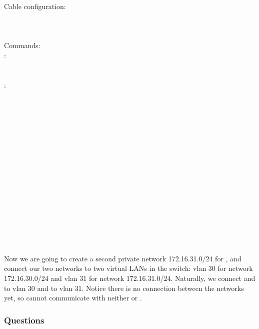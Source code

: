 \documentclass[compilation.tex]{subfiles}
\begin{document}
	\begin{cables}{14}{0.3}
		Cable configuration:\\
		\\
		\\
		\\
		
		Commands:\\
		:\\
		\\
		\\
		:\\
		\\
		\\
		\\
		\\
		\\
		\\
		\\
		\\
		\\
		\\
		\\
		\\
		\\
		\\
		\\
		\\
	\end{cables}
	
	Now we are going to create a second private network 172.16.31.0/24 for , and connect our two networks to two virtual LANs in the switch: vlan 30 for network 172.16.30.0/24 and vlan 31 for network 172.16.31.0/24.
	Naturally, we connect  and  to vlan 30 and  to vlan 31. Notice there is no connection between the networks yet, so  cannot communicate with neither  or .
	
	\subsubsection{Questions}
	\label{subsubsec:exp2questions}
	
\end{document}
